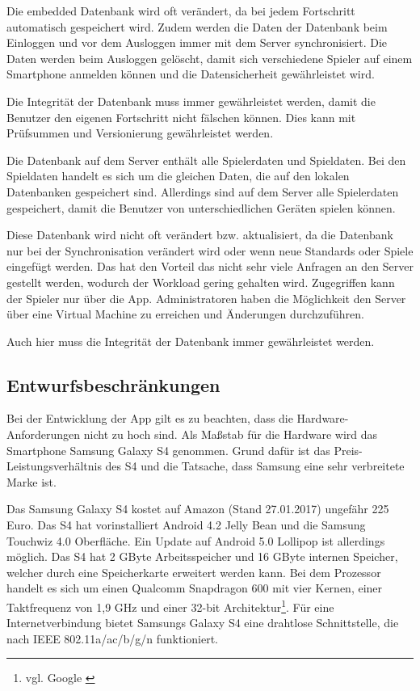 		Die embedded Datenbank wird oft verändert, da bei jedem Fortschritt automatisch gespeichert wird. Zudem werden die Daten der Datenbank beim Einloggen und vor dem Ausloggen immer mit dem Server synchronisiert. Die Daten werden beim Ausloggen gelöscht, damit sich verschiedene Spieler auf einem Smartphone anmelden können und die Datensicherheit gewährleistet wird.
		
		Die Integrität der Datenbank muss immer gewährleistet werden, damit die Benutzer den eigenen Fortschritt nicht fälschen können. Dies kann mit Prüfsummen und Versionierung gewährleistet werden.
		
		Die Datenbank auf dem Server enthält alle Spielerdaten und Spieldaten. Bei den Spieldaten handelt es sich um die gleichen Daten, die auf den lokalen Datenbanken gespeichert sind.  Allerdings sind auf dem Server alle Spielerdaten gespeichert, damit die Benutzer von unterschiedlichen Geräten spielen können. 
		
		Diese Datenbank wird nicht oft verändert bzw. aktualisiert, da die Datenbank nur bei der Synchronisation verändert wird oder wenn neue Standards oder Spiele eingefügt werden. Das hat den Vorteil das nicht sehr viele Anfragen an den Server gestellt werden, wodurch der Workload gering gehalten wird. Zugegriffen kann der Spieler nur über die App. Administratoren haben die Möglichkeit den Server über eine Virtual Machine zu erreichen und Änderungen durchzuführen. 
		
		Auch hier muss die Integrität der Datenbank immer gewährleistet werden.
	
	\subsection{Entwurfsbeschränkungen}
		Bei der Entwicklung der App gilt es zu beachten, dass die Hardware-Anforderungen nicht zu hoch sind. Als Maßstab für die Hardware wird das Smartphone Samsung Galaxy S4 genommen. Grund dafür ist das Preis-Leistungsverhältnis des S4 und die Tatsache, dass Samsung eine sehr verbreitete Marke ist.
		
		Das Samsung Galaxy S4 kostet auf Amazon (Stand 27.01.2017) ungefähr 225 Euro. Das S4 hat vorinstalliert Android 4.2 Jelly Bean und die Samsung Touchwiz 4.0 Oberfläche. Ein Update auf Android 5.0 Lollipop ist allerdings möglich. Das S4 hat 2 GByte Arbeitsspeicher und 16 GByte internen Speicher, welcher durch eine Speicherkarte erweitert werden kann. Bei dem Prozessor handelt es sich um einen Qualcomm Snapdragon 600 mit vier Kernen, einer Taktfrequenz von 1,9 GHz und einer 32-bit Architektur\footnote{vgl. Google \cite{s4Google}}. Für eine Internetverbindung bietet Samsungs Galaxy S4 eine drahtlose Schnittstelle, die nach IEEE 802.11a/ac/b/g/n funktioniert.
		
